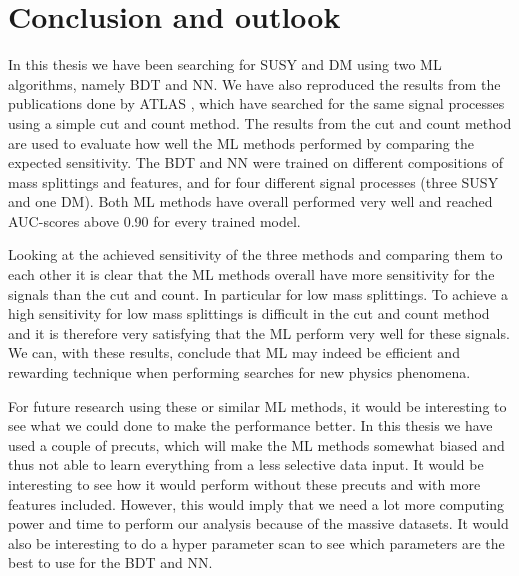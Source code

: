 \chapter{Conclusion and outlook}
\label{sec:Conclusion}

In this thesis we have been searching for SUSY and DM using two ML algorithms, namely BDT and NN. We have also reproduced the results from the publications done by ATLAS \cite{sleptonexclusion, monoZexclusion}, which have searched for the same signal processes using a simple cut and count method. The results from the cut and count method are used to evaluate how well the ML methods performed by comparing the expected sensitivity. The BDT and NN were trained on different compositions of mass splittings and features, and for four different signal processes (three SUSY and one DM). Both ML methods have overall performed very well and reached AUC-scores above 0.90 for every trained model. 

Looking at the achieved sensitivity of the three methods and comparing them to each other it is clear that the ML methods overall have more sensitivity for the signals than the cut and count. In particular for low mass splittings. To achieve a high sensitivity for low mass splittings is difficult in the cut and count method and it is therefore very satisfying that the ML perform very well for these signals. We can, with these results, conclude that ML may indeed be efficient and rewarding technique when performing searches for new physics phenomena. 

For future research using these or similar ML methods, it would be interesting to see what we could done to make the performance better. In this thesis we have used a couple of precuts, which will make the ML methods somewhat biased and thus not able to learn everything from a less selective data input. It would be interesting to see how it would perform without these precuts and with more features included. However, this would imply that we need a lot more computing power and time to perform our analysis because of the massive datasets. It would also be interesting to do a hyper parameter scan to see which parameters are the best to use for the BDT and NN. 







\begin{comment}


Konklusjon:
- ML mer sensitiv
- Si kort om hva som er gjort


Outlook:
- No precuts
- Hyperparameter søk
- Anomaly detection
- Andre/flere features
- 


\end{comment}
